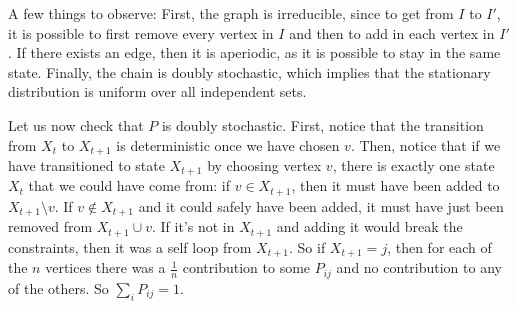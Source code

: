 A few things to observe: First, the graph is irreducible, since to get from $I$ to $I'$, it is possible to first remove every vertex in $I$ and then to add in each vertex in $I'$. If there exists an edge, then it is aperiodic, as it is possible to stay in the same state. Finally, the chain is doubly stochastic, which implies that the stationary distribution is uniform over all independent sets.

Let us now check that $P$ is doubly stochastic. First, notice that the transition from $X_t$ to $X_{t+1}$ is deterministic once we have chosen $v$. Then, notice that if we have transitioned to state $X_{t+1}$ by choosing vertex $v$, there is exactly one state $X_t$ that we could have come from: if $v \in X_{t+1}$, then it must have been added to $X_{t+1} \setminus v$. If $v \notin X_{t+1}$ and it could safely have been added, it must have just been removed from $X_{t+1} \cup v$. If it's not in $X_{t+1}$ and adding it would break the constraints, then it was a self loop from $X_{t+1}$. So if $X_{t+1} = j$, then for each of the $n$ vertices there was a $\frac{1}{n}$ contribution to some $P_{ij}$ and no contribution to any of the others. So $\sum_i P_{ij} = 1$.
